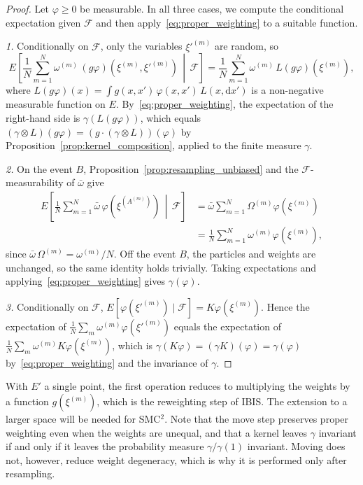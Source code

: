 \begin{proof}
    Let $\varphi\ge0$ be measurable. In all three cases, we compute the conditional expectation given $\mathcal{F}$ and then apply~\eqref{eq:proper_weighting} to a suitable function.

    \emph{1.} Conditionally on $\mathcal{F}$, only the variables $\xi'^{(m)}$ are random, so
    \begin{equation}
        E\left[\frac{1}{N}\sum_{m=1}^{N}\omega^{(m)}\,(g\varphi)(\xi^{(m)},\xi'^{(m)})\,\middle|\,\mathcal{F}\right] = \frac{1}{N}\sum_{m=1}^{N}\omega^{(m)}\,L(g\varphi)(\xi^{(m)}),
    \end{equation}
    where $L(g\varphi)(x) = \int g(x,x')\,\varphi(x,x')\,L(x,\mathrm{d}x')$ is a non-negative measurable function on $E$. By~\eqref{eq:proper_weighting}, the expectation of the right-hand side is $\gamma(L(g\varphi))$, which equals $(\gamma\otimes L)(g\varphi) = \left(g\cdot(\gamma\otimes L)\right)(\varphi)$ by Proposition~\ref{prop:kernel_composition}, applied to the finite measure $\gamma$.

    \emph{2.} On the event $B$, Proposition~\ref{prop:resampling_unbiased} and the $\mathcal{F}$-measurability of $\bar{\omega}$ give
    \begin{align}
        E\left[\frac{1}{N}\sum_{m=1}^{N}\bar{\omega}\,\varphi(\xi^{(A^{(m)})})\,\middle|\,\mathcal{F}\right] &= \bar{\omega}\sum_{m=1}^{N}\Omega^{(m)}\varphi(\xi^{(m)}) \\
        &= \frac{1}{N}\sum_{m=1}^{N}\omega^{(m)}\varphi(\xi^{(m)}),
    \end{align}
    since $\bar{\omega}\,\Omega^{(m)} = \omega^{(m)}/N$. Off the event $B$, the particles and weights are unchanged, so the same identity holds trivially. Taking expectations and applying~\eqref{eq:proper_weighting} gives $\gamma(\varphi)$.

    \emph{3.} Conditionally on $\mathcal{F}$, $E[\varphi(\xi'^{(m)})\mid\mathcal{F}] = K\varphi(\xi^{(m)})$. Hence the expectation of $\frac{1}{N}\sum_m\omega^{(m)}\varphi(\xi'^{(m)})$ equals the expectation of $\frac{1}{N}\sum_m\omega^{(m)}K\varphi(\xi^{(m)})$, which is $\gamma(K\varphi) = (\gamma K)(\varphi) = \gamma(\varphi)$ by~\eqref{eq:proper_weighting} and the invariance of $\gamma$.
\end{proof}

With $E'$ a single point, the first operation reduces to multiplying the weights by a function $g(\xi^{(m)})$, which is the reweighting step of IBIS. The extension to a larger space will be needed for SMC$^2$. Note that the move step preserves proper weighting even when the weights are unequal, and that a kernel leaves $\gamma$ invariant if and only if it leaves the probability measure $\gamma/\gamma(1)$ invariant. Moving does not, however, reduce weight degeneracy, which is why it is performed only after resampling.

